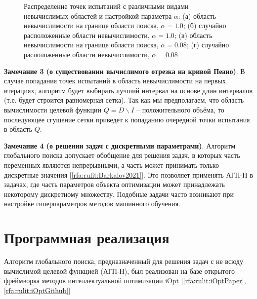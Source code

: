 \documentclass[a4paper,12pt,russian]{article}
\begin{document}
\begin{figure}[h!]
	\caption{Распределение точек испытаний с различными видами невычислимых областей и настройкой параметра $\alpha$: (а) область невычислимости на границе области поиска, $\alpha = 1.0$; (б) случайно расположенные области невычислимости, $\alpha = 1.0$; (в) область невычислимости на границе области поиска, $\alpha = 0.08$; (г) случайно расположенные области невычислимости, $\alpha = 0.08$}
	\label{task_61}
\end{figure}

\textbf{Замечание 3 (о существовании вычислимого отрезка на кривой Пеано)}. В случае попадания точек испытаний в область невычислимости на первых итерациях, алгоритм будет выбирать лучший интервал на основе длин интервалов (т.е. будет строится равномерная сетка). Так как мы предполагаем, что область вычислимости целевой функции $Q = D \backslash I$ -- положительного объёма, то последующее сгущение сетки приведет к попаданию очередной точки испытания в область $Q$.



\textbf{Замечание 4 (о решении задач с дискретными параметрами)}. Алгоритм глобального поиска допускает обобщение для решения задач, в которых часть переменных являются непрерывными, а часть может принимать только дискретные значения [\ref{rfa:rulit:Barkalov2021}]. Это позволяет применять АГП-Н в задачах, где часть параметров объекта оптимизации может принадлежать некоторому дискретному множеству. Подобные задачи часто возникают при настройке гиперпараметров методов машинного обучения.

\section{Программная реализация} \label{iOpt_discr}

Алгоритм глобального поиска, предназначенный для решения задач с не всюду вычислимой целевой функцией (АГП-Н), был реализован на базе открытого фреймворка методов интеллектуальной оптимизации iOpt [\ref{rfa:rulit:iOptPaper},\ref{rfa:rulit:iOptGithub}]
\end{document}
